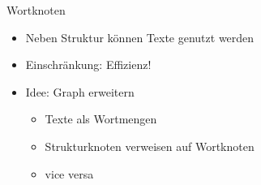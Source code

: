 \begin{frame}{Wortknoten}
    \begin{itemize}
        \item<1-> Neben Struktur können Texte genutzt werden
        \item<2-> Einschränkung: Effizienz!
        \item<3-> Idee: Graph erweitern
        \begin{itemize}
            \item<4-> Texte als Wortmengen
            \item<5-> Strukturknoten verweisen auf Wortknoten
            \item<6-> vice versa
        \end{itemize}
    \end{itemize}
\end{frame}

